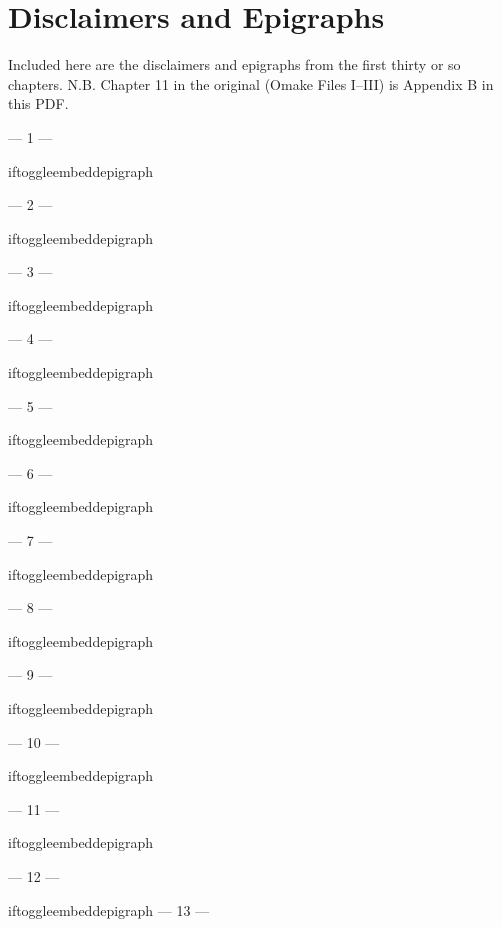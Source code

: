 \chapter{Disclaimers and Epigraphs}

Included here are the disclaimers and epigraphs from the first thirty or so chapters. N.B. Chapter 11 in the original (Omake Files I–III) is Appendix B in this PDF.

{%
\setlength{\parindent}{0pt}
\setlength{\parskip}{1em}

\filbreak
--- 1 ---

iftoggle{embeddepigraph}{}{}

\filbreak
--- 2 ---

iftoggle{embeddepigraph}{}{}

\filbreak
--- 3 ---

iftoggle{embeddepigraph}{}{}

\filbreak
--- 4 ---

iftoggle{embeddepigraph}{}{}

\filbreak
--- 5 ---

iftoggle{embeddepigraph}{}{}

\filbreak
--- 6 ---

iftoggle{embeddepigraph}{}{}

\filbreak
--- 7 ---

iftoggle{embeddepigraph}{}{}

\filbreak
--- 8 ---

iftoggle{embeddepigraph}{}{}

\filbreak
--- 9 ---

iftoggle{embeddepigraph}{}{}

\filbreak
--- 10 ---

iftoggle{embeddepigraph}{}{}

\filbreak
--- 11 ---

iftoggle{embeddepigraph}{}{}

\filbreak
--- 12 ---

iftoggle{embeddepigraph}{}{}
\filbreak
--- 13 ---

}
